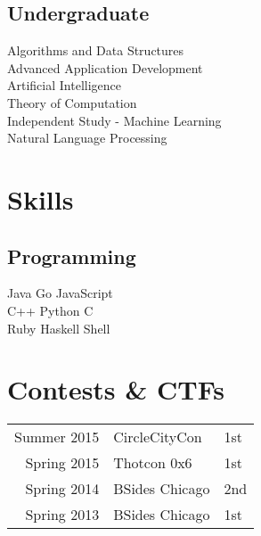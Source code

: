 \documentclass[letterpaper]{deedy-resume} %
\begin{document}
\begin{minipage}[t]{0.33\textwidth}
\subsection{Undergraduate}

Algorithms and Data Structures \\
Advanced Application Development \\
Artificial Intelligence \\
Theory of Computation \\
Independent Study - Machine Learning \\
Natural Language Processing \\

\sectionspace %


\section{Skills}

\subsection{Programming}

Java \textbullet{} Go \textbullet{} JavaScript  \\
 C++ \textbullet{} Python \textbullet{} C \ \\ 
\sectionspace %
Ruby \textbullet{} Haskell \textbullet{} Shell  \\

\sectionspace %



\section{Contests \& CTF\lowercase{s}} 

\begin{tabular}{rll}
Summer 2015 & CircleCityCon & 1st\\
Spring 2015 & Thotcon 0x6 & 1st\\
Spring 2014 & BSides Chicago & 2nd\\
Spring 2013 & BSides Chicago & 1st\\
\end{tabular}

\sectionspace %


\end{minipage} %
\end{document}

